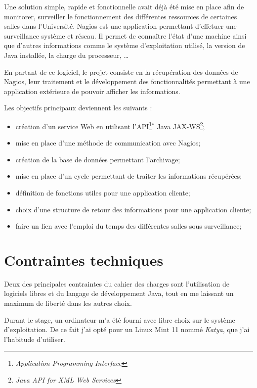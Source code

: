 Une solution simple, rapide et fonctionnelle avait d\'ej\`a \'et\'e mise en place afin de \og{}monitorer\fg{}, \cad{} surveiller le fonctionnement des diff\'erentes ressources de certaines salles dans l'Universit\'e.
Nagios est une application permettant d'effetuer une surveillance syst\`eme et r\'eseau.
Il permet de conna\^itre l'\'etat d'une machine ainsi que d'autres informations comme le syst\`eme d'exploitation utilis\'e, la version de Java install\'ee, la charge du processeur, \ldots

En partant de ce logiciel, le projet consiste en la r\'ecup\'eration des donn\'ees de Nagios, leur traitement et le d\'eveloppement des fonctionnalit\'es permettant \`a une application ext\'erieure de pouvoir afficher les informations.

\noindent Les objectifs principaux deviennent les suivants :

\begin{itemize}
	\item cr\'eation d'un service Web en utilisant l'API\protect\footnote{\textit{Application Programming Interface}}$^*$ Java JAX-WS\protect\footnote{\textit{Java API for XML Web Services}};
	\item mise en place d'une m\'ethode de communication avec Nagios;
	\item cr\'eation de la base de donn\'ees permettant l'archivage;
	\item mise en place d'un cycle permettant de traiter les informations r\'ecup\'er\'ees;
	\item d\'efinition de fonctions utiles pour une application cliente;
	\item choix d'une structure de retour des informations pour une application cliente;
	\item faire un lien avec l'emploi du temps des diff\'erentes salles sous surveillance;

\end{itemize}

\section{Contraintes techniques}

Deux des principales contraintes du cahier des charges sont l'utilisation de logiciels libres et du langage de d\'eveloppement Java, tout en me laissant un maximum de libert\'e dans les autres choix.

Durant le stage, un ordinateur m'a \'et\'e fourni avec libre choix sur le syst\`eme d'exploitation.
De ce fait j'ai opt\'e pour un Linux Mint 11 nomm\'e \textit{Katya}, que j'ai l'habitude d'utiliser.

